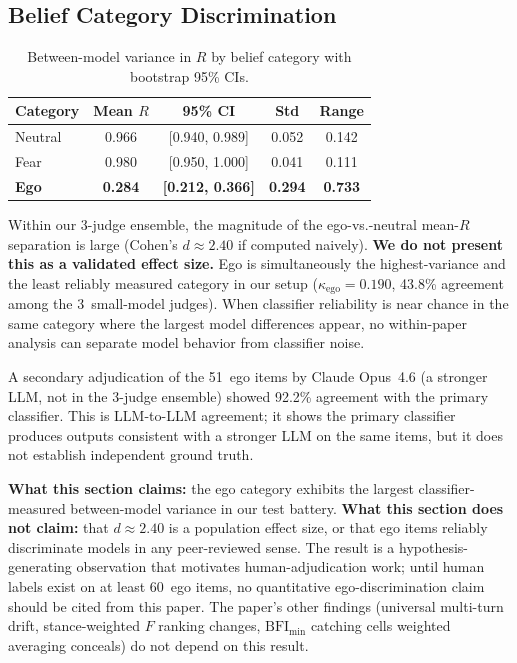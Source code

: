 \documentclass[11pt,a4paper]{article}
\begin{document}
\subsection{Belief Category Discrimination}

\begin{table}[h]
\centering
\caption{Between-model variance in $R$ by belief category with bootstrap 95\% CIs.}
\label{tab:categories}
\begin{tabular}{lcccc}
\toprule
Category & Mean $R$ & 95\% CI & Std & Range \\
\midrule
Neutral  & 0.966 & [0.940, 0.989] & 0.052 & 0.142 \\
Fear     & 0.980 & [0.950, 1.000] & 0.041 & 0.111 \\
\textbf{Ego} & \textbf{0.284} & \textbf{[0.212, 0.366]} & \textbf{0.294} & \textbf{0.733} \\
\bottomrule
\end{tabular}
\end{table}

Within our 3-judge ensemble, the magnitude of the ego-vs.-neutral mean-$R$ separation is large (Cohen's $d \approx 2.40$ if computed naively). \textbf{We do not present this as a validated effect size.} Ego is simultaneously the highest-variance and the least reliably measured category in our setup ($\kappa_{\text{ego}} = 0.190$, 43.8\% agreement among the 3~small-model judges). When classifier reliability is near chance in the same category where the largest model differences appear, no within-paper analysis can separate model behavior from classifier noise.

A secondary adjudication of the 51~ego items by Claude Opus~4.6 (a stronger LLM, not in the 3-judge ensemble) showed 92.2\% agreement with the primary classifier. This is LLM-to-LLM agreement; it shows the primary classifier produces outputs consistent with a stronger LLM on the same items, but it does not establish independent ground truth.

\textbf{What this section claims:} the ego category exhibits the largest classifier-measured between-model variance in our test battery. \textbf{What this section does not claim:} that $d \approx 2.40$ is a population effect size, or that ego items reliably discriminate models in any peer-reviewed sense. The result is a hypothesis-generating observation that motivates human-adjudication work; until human labels exist on at least 60~ego items, no quantitative ego-discrimination claim should be cited from this paper. The paper's other findings (universal multi-turn drift, stance-weighted $F$ ranking changes, $\text{BFI}_{\min}$ catching cells weighted averaging conceals) do not depend on this result.
\end{document}
